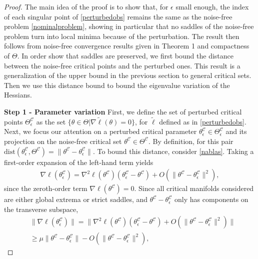 \documentclass[letterpaper, 10 pt]{IEEEtran}  %
\newcommand{\dist}{\mathrm{dist}}
\begin{document}
\begin{proof}
   The main idea of the proof is to show that, for $\epsilon$ small enough, the index of each singular point of \eqref{perturbedobs} remains the same as the noise-free problem \eqref{nominalproblem}, showing in particular that no saddles of the noise-free problem turn into local minima because of the perturbation. 
   The result then follows from noise-free convergence results given in Theorem 1 and compactness of $\Theta$. 
   In order show that saddles are preserved, we first bound the distance between the noise-free critical points and the perturbed ones. This result is a generalization of the upper bound in the previous section to general critical sets. Then we use this distance bound to bound the eigenvalue variation of the Hessians. 
   
   \textbf{Step 1 - Parameter variation} 
   First, we define the set of perturbed critical points $\Theta^\mathcal{C}_{\epsilon}$ as the set  $\{\theta \in \Theta | \nabla \tilde{\ell}(\theta)=0\}$, for $\tilde \ell$ defined as in \eqref{perturbedobs}.
   Next, we focus our attention on a perturbed critical parameter $\theta^\mathcal{C}_\epsilon \in \Theta^\mathcal{C}_{\epsilon}$ and its projection on the noise-free critical set $\theta^\mathcal{C} \in \Theta^\mathcal{C}$.
   By definition, for this pair $\dist(\theta^\mathcal{C}_\epsilon, \Theta^\mathcal{C})=\|\theta^\mathcal{C} - \theta^\mathcal{C}_\epsilon\|$.
   To bound this distance, consider \eqref{nablas}. Taking a first-order expansion of the left-hand term yields
   \begin{align}
      \nabla \ell(\theta^\mathcal{C}_\epsilon)=\nabla^2 \ell(\theta^\mathcal{C})(\theta^\mathcal{C}_\epsilon-\theta^\mathcal{C}) + O(\|\theta^\mathcal{C} - \theta^\mathcal{C}_\epsilon\|^2),
   \end{align}  
   since the zeroth-order term $\nabla \ell (\theta^\mathcal{C})=0$. 
   Since all critical manifolds considered are either global extrema or strict saddles, and $\theta^\mathcal{C} - \theta^\mathcal{C}_\epsilon$ only has components on the 
   transverse subspace, 
   \begin{align}
      & \|\nabla\ell(\theta^\mathcal{C}_\epsilon)\| = \|\nabla^2 \ell(\theta^\mathcal{C})(\theta^\mathcal{C}_\epsilon-\theta^\mathcal{C}) + O(\|\theta^\mathcal{C} - \theta^\mathcal{C}_\epsilon\|^2)\| \\   
      & \ge \mu\|\theta^\mathcal{C} - \theta^\mathcal{C}_\epsilon\| - O(\|\theta^\mathcal{C} - \theta^\mathcal{C}_\epsilon\|^2), \label{perpnabla}
   \end{align}  
   

\end{proof}
\end{document}

